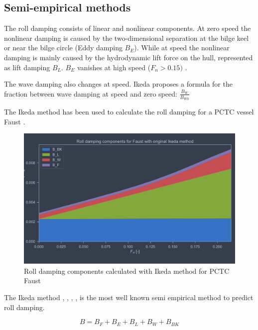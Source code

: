 
\subsection{Semi-empirical methods}
\label{se:semi-empirical methods}

The roll damping consists of linear and nonlinear components. At zero speed the nonlinear damping is caused by the two-dimensional separation at the bilge keel or near the bilge circle (Eddy damping $B_E$). While at speed the nonlinear damping is mainly caused by the hydrodynamic lift force on the hull, represented as lift damping $B_L$. $B_E$ vanishes at high speed ($F_n>0.15)$ \cite{ikeda_components_1978}.

The wave damping also changes at speed. Ikeda \cite{ikeda_components_1978} proposes a formula for the fraction between wave damping at speed and zero speed: $\frac{B_W}{B_{W0}}$

The Ikeda method has been used to calculate the roll damping for a PCTC vessel Faust \cite{soder_assessment_2019}.
\begin{figure}[h]
    \centering
    \includegraphics[width=\columnwidth]{figures/ikeda_faust.pdf}
    \caption{Roll damping components calculated with Ikeda method for PCTC Faust}
    \label{fig:ikeda_faust}
\end{figure}



The Ikeda method \cite{ikeda_roll_1978}, \cite{ikeda_eddy_1978}, \cite{ikeda_roll_1979}, \cite{ikeda_components_1978}, \cite{ikeda_velocity_1979} is the most well known semi empirical method to predict roll damping. 

\begin{equation} \label{eq:ikeda}
B = B_F + B_E + B_L + B_W + B_{BK}
\end{equation}

